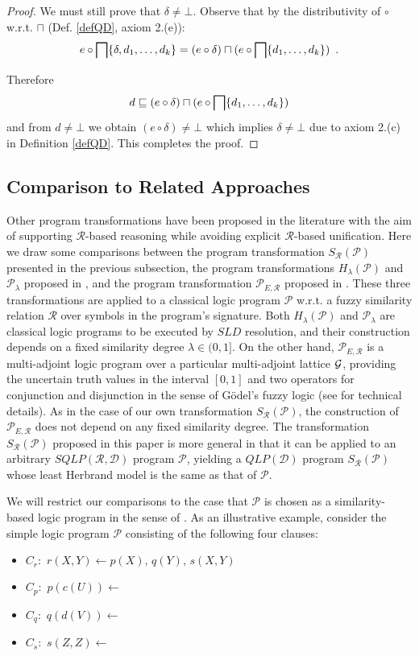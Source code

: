 \documentclass{sigplanconf}
\newcommand{\qdom}{\mathcal{D}} \newcommand{\dqdom}{D \setminus \{\bot\}} \newcommand{\bqdom}{(D \setminus \{\bot\}) \uplus \{?\}}
\newcommand{\simrel}{\mathcal{R}}
\newcommand{\qlp}[1]{QLP({#1})} \newcommand{\slp}[2]{SLP({#1,#2})} \newcommand{\sqlp}[2]{SQLP({#1,#2})} \newcommand{\bqlp}[1]{BQLP({#1})} \newcommand{\clp}[1]{CLP({#1})}
\newcommand{\trans}[2]{S_{#1}(#2)}
\newcommand{\extended}[2]{H_{#1}(#2)} \newcommand{\abstracted}[2]{{#1}_{#2}}
\newcommand{\MAProg}{\mathcal{P}_{E, \simrel}}
\newcommand{\Prog}{\mathcal{P}} \newcommand{\UProg}{\mathcal{P_U}}
\theoremstyle{definition}
\theoremstyle{plain}
\begin{document}
\begin{proof}
We must still prove that $\delta \neq \bot$. Observe that by the distributivity of $\circ$ w.r.t. $\sqcap$ (Def. \ref{defQD}, axiom 2.(e)): $$e \circ \bigsqcap \{\delta, d_1, \ldots, d_k\} = (e \circ \delta) \sqcap (e \circ \bigsqcap \{d_1, \ldots, d_k\}) \enspace .$$

Therefore $$ d \sqsubseteq (e \circ \delta) \sqcap (e \circ \bigsqcap \{d_1, \ldots, d_k\})$$ and from $d \neq \bot$ we obtain $(e \circ \delta) \neq \bot$ which implies $\delta \neq \bot$ due to axiom 2.(c) in Definition \ref{defQD}. This completes the proof.
\end{proof}

\subsection{ Comparison to Related Approaches} \label{sec:RA}

Other program transformations have been proposed in the literature with the aim of supporting $\simrel$-based reasoning while avoiding explicit $\simrel$-based unification. Here we draw some comparisons between the program transformation $\trans{\simrel}{\Prog}$ presented in the previous subsection, the program transformations $\extended{\lambda}{\Prog}$ and $\abstracted{\Prog}{\lambda}$ proposed  in \cite{Ses02}, and the program transformation $\MAProg$ proposed in \cite{MOV04}. These three transformations are applied to a classical logic program $\Prog$ w.r.t. a fuzzy similarity relation $\simrel$ over symbols in the program's signature. Both $\extended{\lambda}{\Prog}$ and $\abstracted{\Prog}{\lambda}$ are classical logic programs to be executed by $SLD$ resolution, and their construction depends on a fixed similarity degree $\lambda \in (0,1]$. On the other hand, $\MAProg$ is a multi-adjoint logic program over a particular multi-adjoint lattice $\mathcal{G}$, providing the uncertain truth values in the interval $[0,1]$ and two operators for conjunction and disjunction in the sense of G\"{o}del's fuzzy logic (see \cite{Voj01} for technical details). As in the case of our own transformation $\trans{\simrel}{\Prog}$, the construction of $\MAProg$  does not depend on any fixed similarity degree. The transformation $\trans{\simrel}{\Prog}$ proposed in this paper is more general in that it can be applied to an arbitrary $\sqlp{\simrel}{\qdom}$ program
$\Prog$, yielding a $\qlp{\qdom}$ program $\trans{\simrel}{\Prog}$ whose least Herbrand model is the same  as that of $\Prog$.

We will restrict our comparisons  to the case that $\Prog$ is chosen as a similarity-based logic program in the sense of \cite{Ses02}. As an illustrative example, consider  the simple logic program $\Prog$ consisting of the following four clauses:
\begin{itemize}
    \item $C_r:\,\, r(X,Y) \gets p(X),\, q(Y),\, s(X,Y)$
    \item $C_p:\,\, p(c(U)) \gets$
    \item $C_q:\,\, q(d(V)) \gets$
    \item $C_s:\,\, s(Z,Z) \gets$
\end{itemize}
\end{document}
